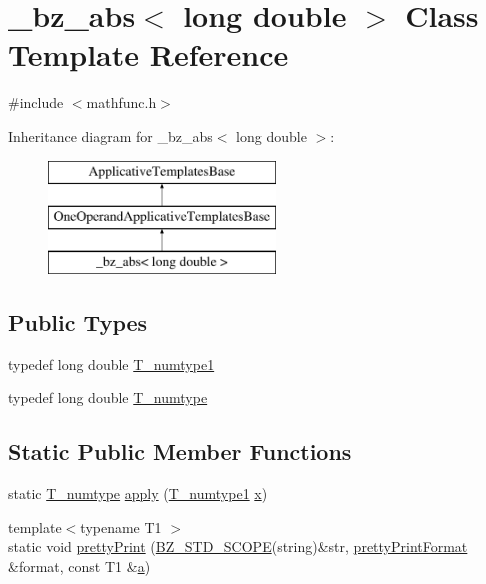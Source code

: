 \hypertarget{class__bz__abs_3_01long_01double_01_4}{}\section{\+\_\+bz\+\_\+abs$<$ long double $>$ Class Template Reference}
\label{class__bz__abs_3_01long_01double_01_4}


{\ttfamily \#include $<$mathfunc.\+h$>$}

Inheritance diagram for \+\_\+bz\+\_\+abs$<$ long double $>$\+:\begin{figure}[H]
\begin{center}
\leavevmode
\includegraphics[height=3.000000cm]{class__bz__abs_3_01long_01double_01_4}
\end{center}
\end{figure}
\subsection*{Public Types}
\begin{DoxyCompactItemize}
\item 
typedef long double \hyperlink{class__bz__abs_3_01long_01double_01_4_a66bee97abcd4da41fb5a786873bb2596}{T\+\_\+numtype1}
\item 
typedef long double \hyperlink{class__bz__abs_3_01long_01double_01_4_a3ba421f974a121054ffabb17f143123a}{T\+\_\+numtype}
\end{DoxyCompactItemize}
\subsection*{Static Public Member Functions}
\begin{DoxyCompactItemize}
\item 
static \hyperlink{class__bz__abs_3_01long_01double_01_4_a3ba421f974a121054ffabb17f143123a}{T\+\_\+numtype} \hyperlink{class__bz__abs_3_01long_01double_01_4_aefc25ecae52db3d616fe6798eefd484d}{apply} (\hyperlink{class__bz__abs_3_01long_01double_01_4_a66bee97abcd4da41fb5a786873bb2596}{T\+\_\+numtype1} \hyperlink{vecnorm1_8cc_ac73eed9e41ec09d58f112f06c2d6cb63}{x})
\item 
{\footnotesize template$<$typename T1 $>$ }\\static void \hyperlink{class__bz__abs_3_01long_01double_01_4_a184b365ced0b100b4e02fb277a97d6ad}{pretty\+Print} (\hyperlink{numinquire_8h_a2b24ffc3b4ef9803956bc7715c6c7b83}{B\+Z\+\_\+\+S\+T\+D\+\_\+\+S\+C\+O\+P\+E}(string)\&str, \hyperlink{classprettyPrintFormat}{pretty\+Print\+Format} \&format, const T1 \&\hyperlink{gen__mat5files_8m_aae328bf20413f220e38aec4d95bfd6da}{a})
\end{DoxyCompactItemize}


